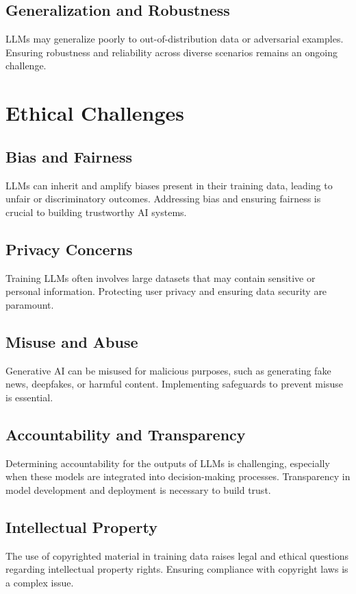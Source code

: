 \subsection{Generalization and Robustness}
LLMs may generalize poorly to out-of-distribution data or adversarial examples. Ensuring robustness and reliability across diverse scenarios remains an ongoing challenge.

\section{Ethical Challenges}

\subsection{Bias and Fairness}
LLMs can inherit and amplify biases present in their training data, leading to unfair or discriminatory outcomes. Addressing bias and ensuring fairness is crucial to building trustworthy AI systems.

\subsection{Privacy Concerns}
Training LLMs often involves large datasets that may contain sensitive or personal information. Protecting user privacy and ensuring data security are paramount.

\subsection{Misuse and Abuse}
Generative AI can be misused for malicious purposes, such as generating fake news, deepfakes, or harmful content. Implementing safeguards to prevent misuse is essential.

\subsection{Accountability and Transparency}
Determining accountability for the outputs of LLMs is challenging, especially when these models are integrated into decision-making processes. Transparency in model development and deployment is necessary to build trust.

\subsection{Intellectual Property}
The use of copyrighted material in training data raises legal and ethical questions regarding intellectual property rights. Ensuring compliance with copyright laws is a complex issue.

